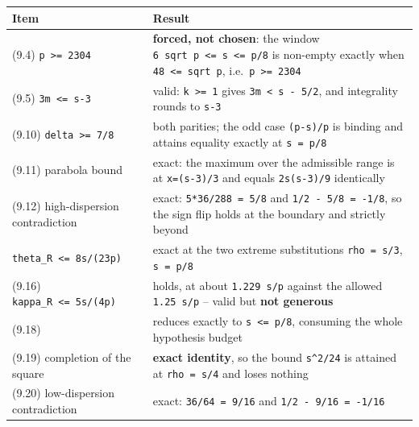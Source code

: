 \documentclass[
  10pt,
]{article}
\newcounter{none} %
\begin{document}
{\def\LTcaptype{none} %
\begin{longtable}[]{@{}
  >{\raggedright\arraybackslash}p{}
  >{\raggedright\arraybackslash}p{}@{}}
\toprule\noalign{}
\begin{minipage}[b]{\linewidth}\raggedright
Item
\end{minipage} & \begin{minipage}[b]{\linewidth}\raggedright
Result
\end{minipage} \\
\midrule\noalign{}
\endhead
\bottomrule\noalign{}
\endlastfoot
(9.4) \texttt{p\ \textgreater{}=\ 2304} & \textbf{forced, not chosen}:
the window \texttt{6\ sqrt\ p\ \textless{}=\ s\ \textless{}=\ p/8} is
non-empty exactly when \texttt{48\ \textless{}=\ sqrt\ p},
i.e.~\texttt{p\ \textgreater{}=\ 2304} \\
(9.5) \texttt{3m\ \textless{}=\ s-3} & valid:
\texttt{k\ \textgreater{}=\ 1} gives
\texttt{3m\ \textless{}\ s\ -\ 5/2}, and integrality rounds to
\texttt{s-3} \\
(9.10) \texttt{delta\ \textgreater{}=\ 7/8} & both parities; the odd
case \texttt{(p-s)/p} is binding and attains equality exactly at
\texttt{s\ =\ p/8} \\
(9.11) parabola bound & exact: the maximum over the admissible range is
at \texttt{x=(s-3)/3} and equals \texttt{2s(s-3)/9} identically \\
(9.12) high-dispersion contradiction & exact: \texttt{5*36/288\ =\ 5/8}
and \texttt{1/2\ -\ 5/8\ =\ -1/8}, so the sign flip holds at the
boundary and strictly beyond \\
\texttt{theta\_R\ \textless{}=\ 8s/(23p)} & exact at the two extreme
substitutions \texttt{rho\ =\ s/3}, \texttt{s\ =\ p/8} \\
(9.16) \texttt{kappa\_R\ \textless{}=\ 5s/(4p)} & holds, at about
\texttt{1.229\ s/p} against the allowed \texttt{1.25\ s/p} -- valid but
\textbf{not generous} \\
(9.18) & reduces exactly to \texttt{s\ \textless{}=\ p/8}, consuming the
whole hypothesis budget \\
(9.19) completion of the square & \textbf{exact identity}, so the bound
\texttt{s\^{}2/24} is attained at \texttt{rho\ =\ s/4} and loses
nothing \\
(9.20) low-dispersion contradiction & exact: \texttt{36/64\ =\ 9/16} and
\texttt{1/2\ -\ 9/16\ =\ -1/16} \\
\end{longtable}
}
\end{document}
